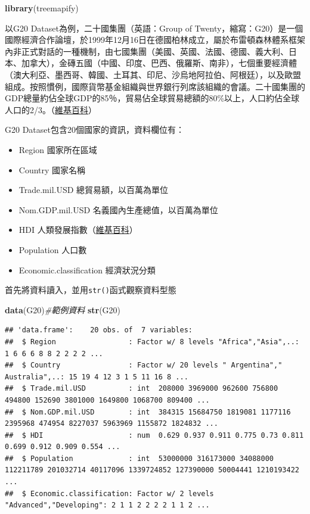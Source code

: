 \documentclass[]{book}
\newenvironment{Shaded}{\begin{snugshade}}{\end{snugshade}}
\newcommand{\KeywordTok}[1]{\textcolor[rgb]{0.13,0.29,0.53}{\textbf{{#1}}}}
\newcommand{\CommentTok}[1]{\textcolor[rgb]{0.56,0.35,0.01}{\textit{{#1}}}}
\newcommand{\NormalTok}[1]{{#1}}
\providecommand{\tightlist}{%
  \setlength{\itemsep}{0pt}\setlength{\parskip}{0pt}}
\theoremstyle{definition}
\theoremstyle{definition}
\theoremstyle{remark}
\begin{document}
\begin{Shaded}
\begin{Highlighting}[]
\KeywordTok{library}\NormalTok{(treemapify)}
\end{Highlighting}
\end{Shaded}

以G20 Dataset為例，二十國集團（英語：Group of
Twenty，縮寫：G20）是一個國際經濟合作論壇，於1999年12月16日在德國柏林成立，屬於布雷頓森林體系框架內非正式對話的一種機制，由七國集團（美國、英國、法國、德國、義大利、日本、加拿大），金磚五國（中國、印度、巴西、俄羅斯、南非），七個重要經濟體（澳大利亞、墨西哥、韓國、土耳其、印尼、沙烏地阿拉伯、阿根廷），以及歐盟組成。按照慣例，國際貨幣基金組織與世界銀行列席該組織的會議。二十國集團的GDP總量約佔全球GDP的85％，貿易佔全球貿易總額的80\%以上，人口約佔全球人口的2/3。（\href{https://en.wikipedia.org/wiki/G-20_major_economies}{維基百科}）

G20 Dataset包含20個國家的資訊，資料欄位有：

\begin{itemize}
\tightlist
\item
  Region 國家所在區域
\item
  Country 國家名稱
\item
  Trade.mil.USD 總貿易額，以百萬為單位
\item
  Nom.GDP.mil.USD 名義國內生產總值，以百萬為單位
\item
  HDI
  人類發展指數（\href{https://zh.wikipedia.org/zh-tw/\%E4\%BA\%BA\%E7\%B1\%BB\%E5\%8F\%91\%E5\%B1\%95\%E6\%8C\%87\%E6\%95\%B0}{維基百科}）
\item
  Population 人口數
\item
  Economic.classification 經濟狀況分類
\end{itemize}

首先將資料讀入，並用\texttt{str()}函式觀察資料型態

\begin{Shaded}
\begin{Highlighting}[]
\KeywordTok{data}\NormalTok{(G20)}\CommentTok{#範例資料}
\KeywordTok{str}\NormalTok{(G20)}
\end{Highlighting}
\end{Shaded}

\begin{verbatim}
## 'data.frame':    20 obs. of  7 variables:
##  $ Region                 : Factor w/ 8 levels "Africa","Asia",..: 1 6 6 6 8 8 2 2 2 2 ...
##  $ Country                : Factor w/ 20 levels " Argentina"," Australia",..: 15 19 4 12 3 1 5 11 16 8 ...
##  $ Trade.mil.USD          : int  208000 3969000 962600 756800 494800 152690 3801000 1649800 1068700 809400 ...
##  $ Nom.GDP.mil.USD        : int  384315 15684750 1819081 1177116 2395968 474954 8227037 5963969 1155872 1824832 ...
##  $ HDI                    : num  0.629 0.937 0.911 0.775 0.73 0.811 0.699 0.912 0.909 0.554 ...
##  $ Population             : int  53000000 316173000 34088000 112211789 201032714 40117096 1339724852 127390000 50004441 1210193422 ...
##  $ Economic.classification: Factor w/ 2 levels "Advanced","Developing": 2 1 1 2 2 2 2 1 1 2 ...
\end{verbatim}
\end{document}

